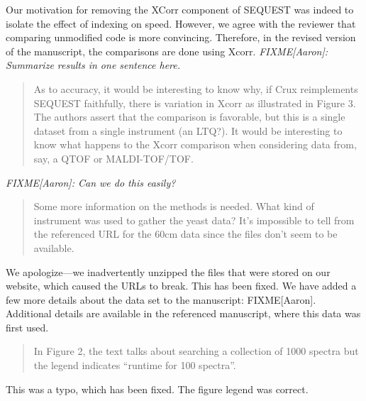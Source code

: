 \documentclass{article}
\newcommand{\breview}{\begin{quotation}\begin{em}\noindent}
\newcommand{\ereview}{\end{em}\end{quotation}}
\begin{document}
Our motivation for removing the XCorr component of SEQUEST was indeed
to isolate the effect of indexing on speed.  However, we agree with
the reviewer that comparing unmodified code is more convincing.
Therefore, in the revised version of the manuscript, the comparisons
are done using Xcorr. {\em FIXME[Aaron]: Summarize results in one
sentence here.}

\breview As to accuracy, it would be interesting to know why, if Crux
reimplements SEQUEST faithfully, there is variation in Xcorr as
illustrated in Figure 3. The authors assert that the comparison is
favorable, but this is a single dataset from a single instrument (an
LTQ?). It would be interesting to know what happens to the Xcorr
comparison when considering data from, say, a QTOF or
MALDI-TOF/TOF. \ereview

{\em FIXME[Aaron]: Can we do this easily?}

\breview Some more information on the methods is needed. What kind of
instrument was used to gather the yeast data? It's impossible to tell
from the referenced URL for the 60cm data since the files don't seem
to be available. \ereview

We apologize---we inadvertently unzipped the files that were stored on
our website, which caused the URLs to break.  This has been fixed.  We
have added a few more details about the data set to the manuscript:
FIXME[Aaron].  Additional details are available in the referenced
manuscript, where this data was first used.

\breview In Figure 2, the text talks about searching a collection of
1000 spectra but the legend indicates ``runtime for 100
spectra''. \ereview

This was a typo, which has been fixed.  The figure legend was correct.
\end{document}
